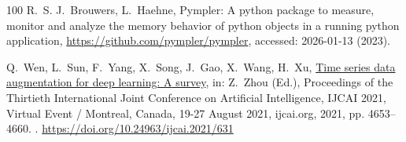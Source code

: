 \documentclass[final,3p,times,twocolumn]{elsarticle}
\begin{document}
\begin{thebibliography}{100}
R.~S. J.~Brouwers, L.~Haehne, Pympler: A python package to measure, monitor and
  analyze the memory behavior of python objects in a running python
  application, \url{https://github.com/pympler/pympler}, accessed: 2026-01-13
  (2023).

Q.~Wen, L.~Sun, F.~Yang, X.~Song, J.~Gao, X.~Wang, H.~Xu,
  \href{https://doi.org/10.24963/ijcai.2021/631}{Time series data augmentation
  for deep learning: {A} survey}, in: Z.~Zhou (Ed.), Proceedings of the
  Thirtieth International Joint Conference on Artificial Intelligence, {IJCAI}
  2021, Virtual Event / Montreal, Canada, 19-27 August 2021, ijcai.org, 2021,
  pp. 4653--4660.
\newblock \href {https://doi.org/10.24963/IJCAI.2021/631}
  {}.
\newline\urlprefix\url{https://doi.org/10.24963/ijcai.2021/631}





\end{thebibliography}
\end{document}
